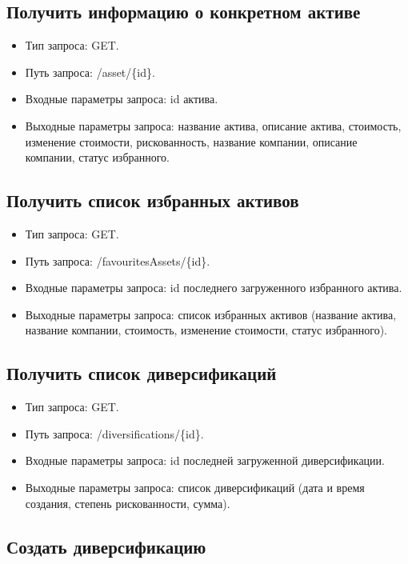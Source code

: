 \documentclass[a4paper, 14pt]{article}
\begin{document}
\subsection{Получить информацию о конкретном активе}

\begin{itemize}
    \item Тип запроса: GET.
    \item Путь запроса: /asset/\{id\}.
    \item Входные параметры запроса: id актива.
    \item Выходные параметры запроса: название актива, описание актива, стоимость, изменение стоимости, рискованность, название компании, описание компании, статус избранного.
\end{itemize}

\subsection{Получить список избранных активов}

\begin{itemize}
    \item Тип запроса: GET.
    \item Путь запроса: /favouritesAssets/\{id\}.
    \item Входные параметры запроса: id последнего загруженного избранного актива.
    \item Выходные параметры запроса: список избранных активов (название актива, название компании, стоимость, изменение стоимости, статус избранного).
\end{itemize}

\subsection{Получить список диверсификаций}

\begin{itemize}
    \item Тип запроса: GET.
    \item Путь запроса: /diversifications/\{id\}.
    \item Входные параметры запроса: id последней загруженной диверсификации.
    \item Выходные параметры запроса: список диверсификаций (дата и время создания, степень рискованности, сумма).
\end{itemize}

\subsection{Создать диверсификацию}
\end{document}
